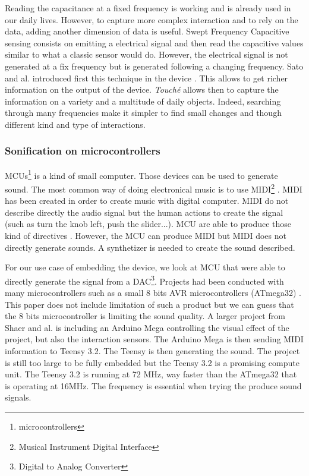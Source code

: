 Reading the capacitance at a fixed frequency is working and is already used in our daily lives. 
However, to capture more complex interaction and to rely on the data, adding another dimension of data is useful.
Swept Frequency Capacitive sensing consists on emitting a electrical signal and then read the capacitive values
similar to what a classic sensor would do. However, the electrical signal is not generated at a fix frequency
but is generated following a changing frequency. 
Sato and al. introduced first this technique in the  device \cite{satoToucheEnhancingTouch2012}.
This allows to get richer information on the output of the device. \textit{Touché} allows then to capture 
the information on a variety and a multitude of daily objects.
Indeed, searching through many frequencies make it simpler to find small changes and though different kind and type 
of interactions.

\subsubsection{Sonification on microcontrollers}

MCUs\footnote{microcontrollers} \cite{rochim2019design} is a kind of small computer.
Those devices can be used to generate sound. The most common way of doing electronical music
is to use MIDI\footnote{Musical Instrument Digital Interface} \cite{loyMusiciansMakeStandard1985}.
MIDI has been created in order to create music with digital computer. MIDI do not describe directly 
the audio signal but the human actions to create the signal (such as turn the knob left, push the slider...).
MCU are able to produce those kind of directives \cite{fazendaProceedingsInternationalConference1}\cite{fazendaProceedingsInternationalConference2}.
However, the MCU can produce MIDI but MIDI does not directly generate sounds. A synthetizer is needed to create the sound
described.

For our use case of embedding the device, we look at MCU that were able to directly generate the signal 
from a DAC\footnote{Digital to Analog Converter}. Projects had been conducted with many microcontrollers such as a small
8 bits AVR microcontrollers (ATmega32) \cite{hussainAVRMicrocontrollerImplementation2011}. This paper does not include limitation of
such a product but we can guess that the 8 bits microcontroller is limiting the sound quality. A larger project from Shaer and al.
\cite{shaerInteractiveCapacitiveTouch2020} is including an Arduino Mega controlling the visual effect of the project,
but also the interaction sensors. The Arduino Mega is then sending MIDI information to Teensy 3.2. The Teensy is then 
generating the sound. The project is still too large to be fully embedded but the Teensy 3.2 is a promising compute unit.
The Teensy 3.2 is running at 72 MHz, way faster than the ATmega32 that is operating at 16MHz. The frequency is essential
when trying the produce sound signals.



